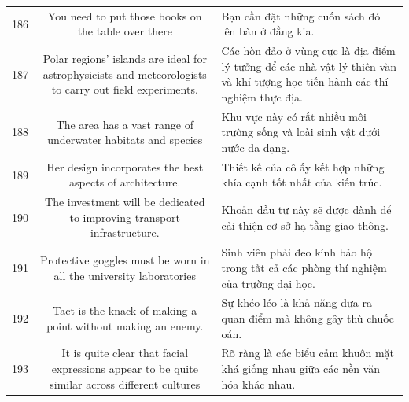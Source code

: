 \documentclass[11pt,a4paper]{article}
\begin{document}
\begin{longtable}{N S M}
186 & You need to put those books on the table over there & Bạn cần đặt những cuốn sách đó lên bàn ở đằng kia. \\
187 & Polar regions' islands are ideal for astrophysicists and meteorologists to carry out field experiments. & Các hòn đảo ở vùng cực là địa điểm lý tưởng để các nhà vật lý thiên văn và khí tượng học tiến hành các thí nghiệm thực địa. \\
188 & The area has a vast range of underwater habitats and species & Khu vực này có rất nhiều môi trường sống và loài sinh vật dưới nước đa dạng. \\
189 & Her design incorporates the best aspects of architecture. & Thiết kế của cô ấy kết hợp những khía cạnh tốt nhất của kiến ​​trúc. \\
190 & The investment will be dedicated to improving transport infrastructure. & Khoản đầu tư này sẽ được dành để cải thiện cơ sở hạ tầng giao thông. \\
191 & Protective goggles must be worn in all the university laboratories & Sinh viên phải đeo kính bảo hộ trong tất cả các phòng thí nghiệm của trường đại học. \\
192 & Tact is the knack of making a point without making an enemy. & Sự khéo léo là khả năng đưa ra quan điểm mà không gây thù chuốc oán. \\
193 & It is quite clear that facial expressions appear to be quite similar across different cultures & Rõ ràng là các biểu cảm khuôn mặt khá giống nhau giữa các nền văn hóa khác nhau. \\
\end{longtable}
\end{document}
